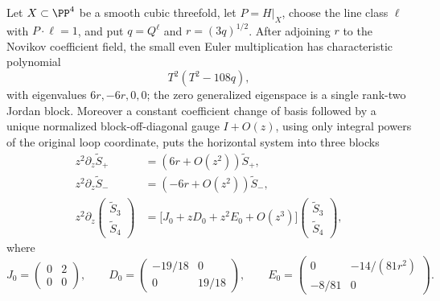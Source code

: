 \begin{proposition}\label{prop:cubic-block-data}
%
%
%
Let \(X\subset\PP^4\) be a smooth cubic threefold, let \(P=H|_X\), choose
the line class \(\ell\) with \(P\cdot\ell=1\), and put \(q=Q^\ell\) and
\(r=(3q)^{1/2}\).  After adjoining \(r\) to the Novikov coefficient field,
the small even Euler multiplication has characteristic polynomial
\[
  T^2(T^2-108q),
\]
with eigenvalues \(6r,-6r,0,0\); the zero generalized eigenspace is a
single rank-two Jordan block.  Moreover a constant coefficient change of
basis followed by a unique normalized block-off-diagonal gauge
\(I+O(z)\), using only integral powers of the original loop coordinate,
puts the horizontal system into three blocks
\begin{equation}\label{eq:cubic-integral-block-reduction}
 \begin{aligned}
 z^2\partial_z\widetilde S_+&=(6r+O(z^2))\widetilde S_+,\\
 z^2\partial_z\widetilde S_-&=(-6r+O(z^2))\widetilde S_-,\\
 z^2\partial_z
 \begin{pmatrix}\widetilde S_3\\\widetilde S_4\end{pmatrix}
 &=\bigl[J_0+zD_0+z^2E_0+O(z^3)\bigr]
 \begin{pmatrix}\widetilde S_3\\\widetilde S_4\end{pmatrix},
 \end{aligned}
\end{equation}
where
\begin{equation}\label{eq:cubic-shared-block-data}
 J_0=\begin{pmatrix}0&2\\0&0\end{pmatrix},\qquad
 D_0=\begin{pmatrix}-19/18&0\\0&19/18\end{pmatrix},\qquad
 E_0=\begin{pmatrix}0&-14/(81r^2)\\-8/81&0\end{pmatrix}.
\end{equation}
\end{proposition}

